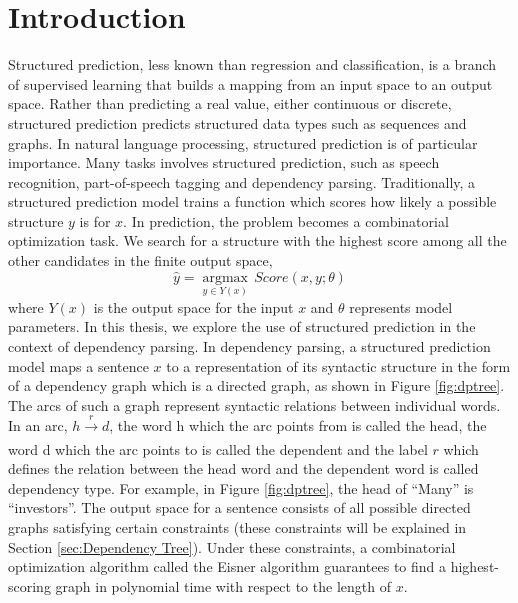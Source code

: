 

\chapter{Introduction}
\label{cha:introduction}
Structured prediction, less known than regression and classification, is a branch of supervised learning that builds a mapping from an input space to an output space. Rather than predicting a real value, either continuous or discrete, structured prediction predicts structured data types such as sequences and graphs. In natural language processing, structured prediction is of particular importance. Many tasks involves structured prediction, such as speech recognition, part-of-speech tagging and dependency parsing. Traditionally, a structured prediction model trains a function which scores how likely a possible structure $y$ is for $x$. In prediction, the problem becomes a combinatorial optimization task. We search for a structure with the highest score among all the other candidates in the finite output space, 
\begin{equation}
\label{eq:ctr}
\hat{y}=\underset{y\in Y(x)}{\operatorname{argmax}}\,Score(x,y;\theta)
\end{equation}   
where $Y(x)$ is the output space for the input $x$ and $\theta$ represents model parameters. In this thesis, we explore the use of structured prediction in the context of dependency parsing. In dependency parsing, a structured prediction model maps a sentence $x$ to a representation of its syntactic structure in the form of a dependency graph which is a directed graph, as shown in Figure \ref{fig:dptree}. The arcs of such a graph represent syntactic relations between individual words. In an arc, $h\xrightarrow[]{r} d$, the word h which the arc points from is called the head, the word d which the arc points to is called the dependent and the label $r$ which defines the relation between the head word and the dependent word is called dependency type. For example, in Figure \ref{fig:dptree}, the head of ``Many'' is ``investors''. The output space for a sentence consists of all possible directed graphs satisfying certain constraints (these constraints will be explained in Section \ref{sec:Dependency Tree}). Under these constraints, a combinatorial optimization algorithm called the Eisner algorithm guarantees to find a highest-scoring graph in polynomial time with respect to the length of $x$.

